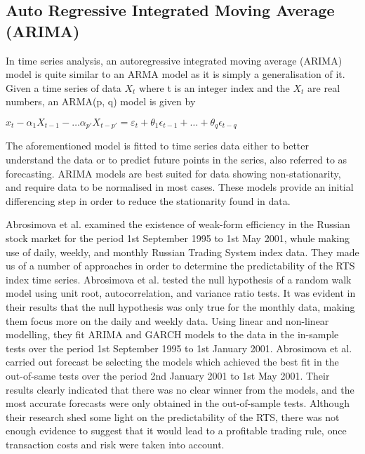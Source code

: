 \subsection{Auto Regressive Integrated Moving Average (ARIMA)}

In time series analysis, an autoregressive integrated moving average (ARIMA) model is quite similar to an ARMA model as it is simply a generalisation of it. Given a time series of data $X_t$ where t is an integer index and the $X_t$ are real numbers, an ARMA(p, q) model is given by

\(x_t - \alpha_1 X_{t-1} - \dots \alpha_{p'} X_{t-p'} = \varepsilon_t + \theta_1 \epsilon_{t-1} + \dots + \theta_q \epsilon_{t-q}\)

The aforementioned model is fitted to time series data either to better understand the data or to predict future points in the series, also referred to as forecasting. ARIMA models are best suited for data showing non-stationarity, and require data to be normalised in most cases. These models provide an initial differencing step in order to reduce the stationarity found in data.

Abrosimova et al. examined the existence of weak-form efficiency in the Russian stock market for the period 1st September 1995 to 1st May 2001, whule making use of daily, weekly, and monthly Russian Trading System index data.\cite{Abrosimova:2002aa} They made us of a number of approaches in order to determine the predictability of the RTS index time series. Abrosimova et al. tested the null hypothesis of a random walk model using unit root, autocorrelation, and variance ratio tests. It was evident in their results that the null hypothesis was only true for the monthly data, making them focus more on the daily and weekly data. Using linear and non-linear modelling, they fit ARIMA and GARCH models to the data in the in-sample tests over the period 1st September 1995 to 1st January 2001. Abrosimova et al. carried out forecast be selecting the models which achieved the best fit in the out-of-same tests over the period 2nd January 2001 to 1st May 2001. Their results clearly indicated that there was no clear winner from the models, and the most accurate forecasts were only obtained in the out-of-sample tests. Although their research shed some light on the predictability of the RTS, there was not enough evidence to suggest that it would lead to a profitable trading rule, once transaction costs and risk were taken into account.

